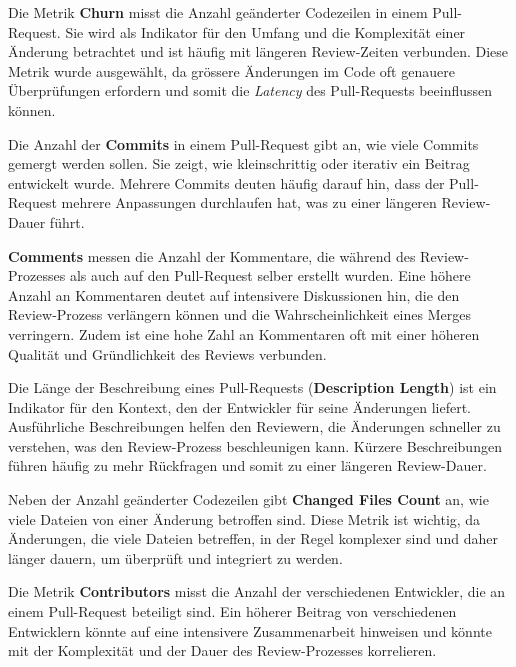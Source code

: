 Die Metrik \textbf{Churn} misst die Anzahl geänderter Codezeilen in einem Pull-Request. Sie wird als Indikator für den Umfang und die Komplexität einer Änderung betrachtet und ist häufig mit längeren Review-Zeiten verbunden. Diese Metrik wurde ausgewählt, da grössere Änderungen im Code oft genauere Überprüfungen erfordern und somit die \textit{Latency} des Pull-Requests beeinflussen können. \parencite{gousios_exploratory_2014}

Die Anzahl der \textbf{Commits} in einem Pull-Request gibt an, wie viele Commits gemergt werden sollen. Sie zeigt, wie kleinschrittig oder iterativ ein Beitrag entwickelt wurde. Mehrere Commits deuten häufig darauf hin, dass der Pull-Request mehrere Anpassungen durchlaufen hat, was zu einer längeren Review-Dauer führt. \parencite{zhang_pull_2022}

\textbf{Comments} messen die Anzahl der Kommentare, die während des Review-Prozesses als auch auf den Pull-Request selber erstellt wurden. Eine höhere Anzahl an Kommentaren deutet auf intensivere Diskussionen hin, die den Review-Prozess verlängern können und die Wahrscheinlichkeit eines Merges verringern. Zudem ist eine hohe Zahl an Kommentaren oft mit einer höheren Qualität und Gründlichkeit des Reviews verbunden. \parencite{tsay_influence_2014}

Die Länge der Beschreibung eines Pull-Requests (\textbf{Description Length}) ist ein Indikator für den Kontext, den der Entwickler für seine Änderungen liefert. Ausführliche Beschreibungen helfen den Reviewern, die Änderungen schneller zu verstehen, was den Review-Prozess beschleunigen kann. Kürzere Beschreibungen führen häufig zu mehr Rückfragen und somit zu einer längeren Review-Dauer. \parencite{zhang_pull_2022}

Neben der Anzahl geänderter Codezeilen gibt \textbf{Changed Files Count} an, wie viele Dateien von einer Änderung betroffen sind. Diese Metrik ist wichtig, da Änderungen, die viele Dateien betreffen, in der Regel komplexer sind und daher länger dauern, um überprüft und integriert zu werden. \parencite{tsay_influence_2014}

Die Metrik \textbf{Contributors} misst die Anzahl der verschiedenen Entwickler, die an einem Pull-Request beteiligt sind. Ein höherer Beitrag von verschiedenen Entwicklern könnte auf eine intensivere Zusammenarbeit hinweisen und könnte mit der Komplexität und der Dauer des Review-Prozesses korrelieren.

\newpage  
